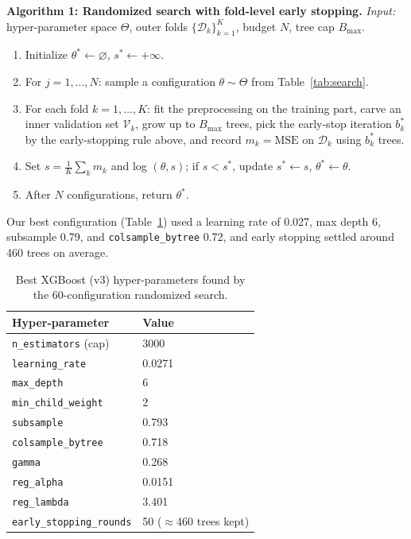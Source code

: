 \documentclass[journal]{IEEEtran}
\begin{document}
\vspace{2pt}
\noindent\textbf{Algorithm 1: Randomized search with fold-level early stopping.}
\emph{Input:} hyper-parameter space $\Theta$, outer folds
$\{\mathcal{D}_k\}_{k=1}^{K}$, budget $N$, tree cap $B_{\max}$.
\begin{enumerate}
\item Initialize $\theta^{*}\leftarrow\varnothing$, $s^{*}\leftarrow+\infty$.
\item For $j=1,\dots,N$: sample a configuration $\theta\sim\Theta$ from
Table~\ref{tab:search}.
\item For each fold $k=1,\dots,K$: fit the preprocessing on the training part,
carve an inner validation set $\mathcal{V}_k$, grow up to $B_{\max}$ trees, pick
the early-stop iteration $b_k^{*}$ by the early-stopping rule above, and record
$m_k=\mathrm{MSE}$ on $\mathcal{D}_k$ using $b_k^{*}$ trees.
\item Set $s=\frac{1}{K}\sum_k m_k$ and log $(\theta,s)$; if $s<s^{*}$, update
$s^{*}\leftarrow s$, $\theta^{*}\leftarrow\theta$.
\item After $N$ configurations, return $\theta^{*}$.
\end{enumerate}
\vspace{2pt}

Our best configuration (Table~\ref{tab:xgbparams}) used a learning rate of
0.027, max depth 6, subsample 0.79, and \texttt{colsample\_bytree} 0.72, and
early stopping settled around 460 trees on average.

\begin{table}[!t]
\caption{Best XGBoost (v3) hyper-parameters found by the 60-configuration
randomized search.}
\label{tab:xgbparams}
\centering
\begin{tabular}{ll}
\toprule
Hyper-parameter & Value \\
\midrule
\texttt{n\_estimators} (cap) & 3000 \\
\texttt{learning\_rate} & 0.0271 \\
\texttt{max\_depth} & 6 \\
\texttt{min\_child\_weight} & 2 \\
\texttt{subsample} & 0.793 \\
\texttt{colsample\_bytree} & 0.718 \\
\texttt{gamma} & 0.268 \\
\texttt{reg\_alpha} & 0.0151 \\
\texttt{reg\_lambda} & 3.401 \\
\texttt{early\_stopping\_rounds} & 50 ($\approx$460 trees kept) \\
\bottomrule
\end{tabular}
\end{table}
\end{document}
